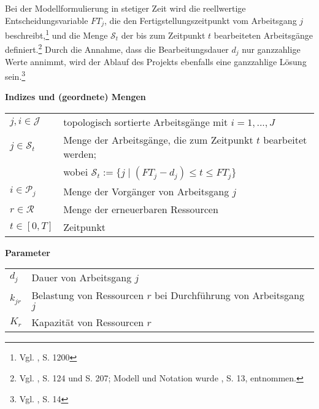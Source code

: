 \documentclass[a4paper,12pt,normalheadings,footexclude,headinclude,liststotoc,nochapterprefix,onecolumn,oneside,parskip,pointlessnumbers]{scrreprt}
\begin{document}
Bei der Modellformulierung in stetiger Zeit wird die reellwertige Entscheidungsvariable $FT_{j}$, die den Fertigstellungszeitpunkt vom Arbeitsgang $j$ beschreibt,\footnote{Vgl. \cite{talbot1982resource}, S. 1200} und die Menge $\mathcal{S}_{t}$ der bis zum Zeitpunkt $t$ bearbeiteten Arbeitsgänge definiert.\footnote{Vgl. \cite{projektpl2006zimme}, S. 124 und S. 207; Modell und Notation wurde \cite{kellenbrink2014einfuhrung}, S. 13, entnommen.} Durch die Annahme, dass die Bearbeitungsdauer $d_{j}$ nur ganzzahlige Werte annimmt, wird der Ablauf des Projekts ebenfalls eine ganzzahlige Lösung sein.\footnote{Vgl. \cite{kellenbrink2014einfuhrung}, S. 14}

\textbf{Indizes und (geordnete) Mengen}
\begin{table}[h!]
    \vspace*{-3mm}
    \hspace*{2mm}
  \renewcommand{\arraystretch}{1,5}
   \begin{tabular}{ll}  %
     $j,i \in \mathcal{J}$	& topologisch sortierte Arbeitsgänge mit $i = 1,...,J$\\
$j \in \mathcal{S}_{t}$	& Menge der Arbeitsgänge, die zum Zeitpunkt $t$ bearbeitet werden;\\
& wobei $\mathcal{S}_ {t}:= \{ j \; \vert \; (FT_{j}-d_{j})\leq t \leq FT_{j}\}$\\
$i \in \mathcal{P}_{j}$	& Menge der Vorgänger von Arbeitsgang $j$\\
$r \in \mathcal{R}$	& Menge der erneuerbaren Ressourcen\\
$t \in [0,T]$	& Zeitpunkt\\ 
	\end{tabular}
\end{table}

\textbf{Parameter}
\begin{table}[h!]
    \vspace*{-3mm}
    \hspace*{2mm}
  \renewcommand{\arraystretch}{1,5}
   \begin{tabular}{ll}  %
     $d_{j}$	& Dauer von Arbeitsgang $j$\\ 
$k_{jr}$	& Belastung von Ressourcen $r$ bei Durchführung von Arbeitsgang $j$\\ 
$K_{r}$	& Kapazität von Ressourcen $r$\\
	\end{tabular}
\end{table}
\end{document}
